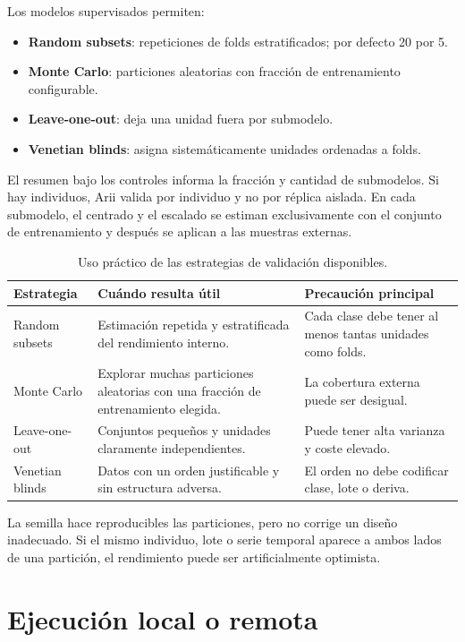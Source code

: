 \documentclass[11pt,a4paper,openany]{report}
\begin{document}
Los modelos supervisados permiten:

\begin{itemize}[leftmargin=*]
  \item \textbf{Random subsets}: repeticiones de folds estratificados; por
  defecto 20 por 5.
  \item \textbf{Monte Carlo}: particiones aleatorias con fracción de entrenamiento
  configurable.
  \item \textbf{Leave-one-out}: deja una unidad fuera por submodelo.
  \item \textbf{Venetian blinds}: asigna sistemáticamente unidades ordenadas a
  folds.
\end{itemize}

El resumen bajo los controles informa la fracción y cantidad de submodelos. Si
hay individuos, Arii valida por individuo y no por réplica aislada. En cada
submodelo, el centrado y el escalado se estiman exclusivamente con el conjunto
de entrenamiento y después se aplican a las muestras externas.

\begin{table}[H]
\centering
\small
\begin{tabularx}{\textwidth}{@{}p{}XX@{}}
\toprule
\textbf{Estrategia} & \textbf{Cuándo resulta útil} & \textbf{Precaución principal} \\
\midrule
Random subsets & Estimación repetida y estratificada del rendimiento interno. &
Cada clase debe tener al menos tantas unidades como folds. \\
Monte Carlo & Explorar muchas particiones aleatorias con una fracción de
entrenamiento elegida. & La cobertura externa puede ser desigual. \\
Leave-one-out & Conjuntos pequeños y unidades claramente independientes. &
Puede tener alta varianza y coste elevado. \\
Venetian blinds & Datos con un orden justificable y sin estructura adversa. &
El orden no debe codificar clase, lote o deriva. \\
\bottomrule
\end{tabularx}
\caption{Uso práctico de las estrategias de validación disponibles.}
\end{table}

La semilla hace reproducibles las particiones, pero no corrige un diseño
inadecuado. Si el mismo individuo, lote o serie temporal aparece a ambos lados
de una partición, el rendimiento puede ser artificialmente optimista.

\section{Ejecución local o remota}
\end{document}
